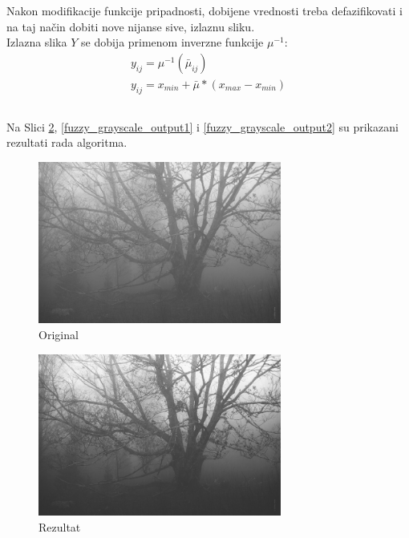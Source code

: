 \documentclass[12pt,a4paper]{article}
\theoremstyle{definition}
\theoremstyle{remark}
\theoremstyle{plain}
\begin{document}
Nakon modifikacije funkcije pripadnosti, dobijene vrednosti treba defazifikovati i na taj na\v cin dobiti nove nijanse sive, izlaznu sliku.\\
Izlazna slika $Y$ se dobija primenom inverzne funkcije $\mu^{-1}$:\\
\begin{align*}
  y_{ij} = \mu^{-1}(\bar\mu_{ij})\\
  y_{ij} = x_{min} + \bar\mu * (x_{max} - x_{min})
\end{align*}

\inputminted[tabsize=2,breaklines]{cpp}{codes/latex/fuzzy_grayscale.cpp}

Na Slici \ref{tree_fuzzy_grayscale_output}, \ref{fuzzy_grayscale_output1} i \ref{fuzzy_grayscale_output2} su prikazani rezultati rada algoritma.

\begin{multicols}{2}
\begin{figure}[H]
\centering
\includegraphics[width=8cm]{images/tree.jpg}
  \caption{Original}\label{tree_fuzzy_grayscale_input}
\end{figure}
\columnbreak
\begin{figure}[H]
\centering
\includegraphics[width=8cm]{images/fuzzy_grayscale_0.jpg}
  \caption{Rezultat}\label{tree_fuzzy_grayscale_output}
\end{figure}
\end{multicols}

\newpage
\end{document}
